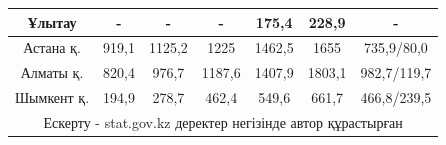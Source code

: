 \begin{table}[H]
{\begin{tabular}{|ccccccc|}
\multicolumn{1}{|c|}{Ұлытау} &
  \multicolumn{1}{c|}{-} &
  \multicolumn{1}{c|}{-} &
  \multicolumn{1}{c|}{-} &
  \multicolumn{1}{c|}{175,4} &
  \multicolumn{1}{c|}{228,9} &
  - \\ \hline
\multicolumn{1}{|c|}{Астана қ.} &
  \multicolumn{1}{c|}{919,1} &
  \multicolumn{1}{c|}{1125,2} &
  \multicolumn{1}{c|}{1225} &
  \multicolumn{1}{c|}{1462,5} &
  \multicolumn{1}{c|}{1655} &
  735,9/80,0 \\ \hline
\multicolumn{1}{|c|}{Алматы қ.} &
  \multicolumn{1}{c|}{820,4} &
  \multicolumn{1}{c|}{976,7} &
  \multicolumn{1}{c|}{1187,6} &
  \multicolumn{1}{c|}{1407,9} &
  \multicolumn{1}{c|}{1803,1} &
  982,7/119,7 \\ \hline
\multicolumn{1}{|c|}{Шымкент қ.} &
  \multicolumn{1}{c|}{194,9} &
  \multicolumn{1}{c|}{278,7} &
  \multicolumn{1}{c|}{462,4} &
  \multicolumn{1}{c|}{549,6} &
  \multicolumn{1}{c|}{661,7} &
  466,8/239,5 \\ \hline
\multicolumn{7}{|c|}{Ескерту - stat.gov.kz деректер негізінде автор құрастырған} \\ \hline
\end{tabular}%
}
\end{table}

